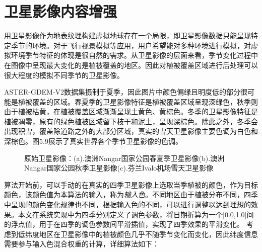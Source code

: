 \section{卫星影像内容增强}
用卫星影像作为地表纹理构建虚拟地球存在一个局限，即卫星影像数据只能呈现特定季节的环境。对于飞行视景模拟等应用，用户希望能对多种环境进行模拟，对虚拟环境季节特征的体现是很自然的需求。从卫星影像的层面来看，季节变化过程中在图像中呈现最大变化的是植被覆盖的地区。因此对植被覆盖区域进行后处理可以很大程度的模拟不同季节的卫星影像。\par
ASTER-GDEM-V2数据集摄制于夏季，因此图片中颜色偏绿且明度低的部分很可能是植被覆盖的区域。春夏季的卫星影像特征是植被覆盖区域呈现深绿色，秋季则由于植被枯黄，在植被覆盖区域渐渐呈现土黄色、黄棕色。冬季的卫星影像特征是植被凋零，原有的绿色植被区域留下枝干和泥土，呈现深棕色。除此之外，冬季会出现积雪，覆盖除道路之外的大部分区域，真实的雪天卫星影像主要色调为白色和深棕色。图5.9展示了真实世界各个季节卫星影像的色调。
\begin{figure}[!h]
    \centering
   
    \caption{原始卫星影像：(a).澳洲Nangar国家公园春夏季卫星影像\supercite{nangar}(b).澳洲Nangar国家公园秋季卫星影像\supercite{nangar}(c).芬兰Ivalo机场雪天卫星影像\supercite{thaws}}
\end{figure}

算法开始前，可以手动的在真实的四季卫星影像上选取当季植被的颜色，作为目标颜色，该颜色值为本算法的输入，称为\textit{输入色}。不同地区由于植被分布不同，四季中呈现的颜色变化规律也不同，根据输入色的不同，可以进行调整以达到理想的效果。本文在系统实现中为四季分别定义了调色参数，将日期折算为一个[0.0,1.0]间的浮点值，用于在四季的调色参数间平滑插值，实现了四季效果的平滑变化。
考虑到低纬度地区在卫星影像中的植被颜色几乎不随季节变化而变化，因此纬度信息需要参与输入色混合权重的计算，详细算法如下：\par

